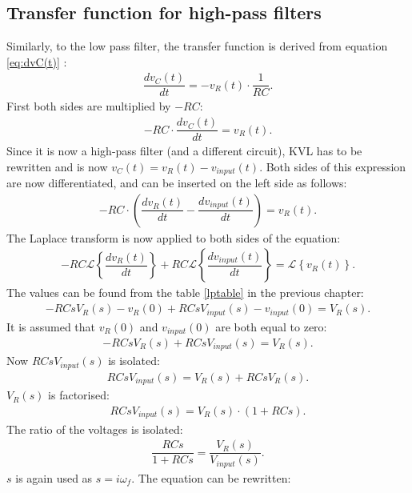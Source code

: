 \subsection{Transfer function for high-pass filters}
Similarly, to the low pass filter, the transfer function is derived from equation \eqref{eq:dvC(t)} :
\begin{align*}
\dfrac{dv_{C}(t)}{dt} = -v_{R}(t) \cdot \dfrac{1}{RC}.
\end{align*}
First both sides are multiplied by $-RC$:
\begin{align*}
-RC \cdot \dfrac{dv_{C}(t)}{dt} = v_{R}(t).
\end{align*}
Since it is now a high-pass filter (and a different circuit), KVL has to be rewritten and is now $v_{C}(t)=v_{R}(t)-v_{input}(t)$. Both sides of this expression are now differentiated, and can be inserted on the left side as follows:
\begin{align*}
-RC \cdot \left(\dfrac{dv_{R}(t)}{dt} - \dfrac{dv_{input}(t)}{dt} \right) = v_{R}(t).
\end{align*}
The Laplace transform is now applied to both sides of the equation:
\begin{align*}
-RC \mathcal{L} \left\{\dfrac{dv_{R}(t)}{dt} \right\} + RC \mathcal{L} \left\{ \dfrac{dv_{input}(t)}{dt} \right\} = \mathcal{L} \left\{v_{R}(t) \right\}.
\end{align*}
The values can be found from the table \ref{lptable} in the previous chapter:
\begin{align*}
-RCsV_{R}(s)-v_{R}(0) + RCsV_{input}(s)-v_{input}(0) = V_{R}(s).
\end{align*}
It is assumed that $v_{R}(0)$ and $v_{input}(0)$ are both equal to zero:
\begin{align*}
-RCsV_{R}(s) + RCsV_{input}(s) = V_{R}(s).
\end{align*}
Now $RCs V_{input}(s)$ is isolated:
\begin{align*}
RCsV_{input}(s) = V_{R}(s) + RCsV_{R}(s).
\end{align*}
$V_{R}(s)$ is factorised:
\begin{align*}
RCsV_{input}(s) = V_{R}(s) \cdot (1 + RCs).
\end{align*}
The ratio of the voltages is isolated:
\begin{align} \label{hp:visolated}
\dfrac{RCs}{1 + RCs} = \dfrac{V_{R}(s)}{V_{input}(s)}.
\end{align}
$s$ is again used as $s=i\omega_f$. The equation can be rewritten:
